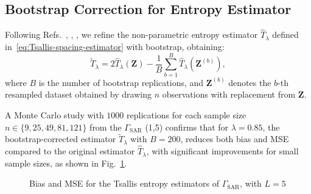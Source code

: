 \documentclass[
  lettersize  journal,
]{IEEEtran}%
\begin{document}
\subsection{Bootstrap Correction for Entropy
Estimator}\label{bootstrap-correction-for-entropy-estimator}

Following Refs.~,
,
, we refine the non-parametric
entropy estimator \(\widehat{T}_{\lambda}\) defined
in~\eqref{eq:Tsallis-spacing-estimator} with bootstrap, obtaining:
\begin{equation*}
\widetilde{T}_{\lambda} = 2\widehat{T}_{\lambda}(\bm{Z}) - \frac{1}{B} \sum_{b=1}^{B} \widehat{T}_{\lambda}(\bm{Z}^{(b)}),
\end{equation*} where \(B\) is the number of bootstrap replications, and
\(\bm{Z}^{(b)}\) denotes the \(b\)-th resampled dataset obtained by
drawing \(n\) observations with replacement from \(\bm{Z}\).

A Monte Carlo study with \(1000\) replications for each sample size
\(n \in \{9, 25, 49, 81, 121\}\) from the \(\Gamma_{\text{SAR}}\) (1,5)
confirms that for \(\lambda=0.85\), the bootstrap-corrected estimator
\(\widetilde{T}_{\lambda}\) with \(B=200\), reduces both bias and MSE
compared to the original estimator \(\widehat{T}_{\lambda}\), with
significant improvements for small sample sizes, as shown in
Fig.~\ref{fig-bias_mse_Tsallis}.

\begin{figure}[H]


\caption{\label{fig-bias_mse_Tsallis}Bias and MSE for the Tsallis
entropy estimators of \(\Gamma_{\text{SAR}}\), with \(L=5\)}

\end{figure}%
\end{document}
